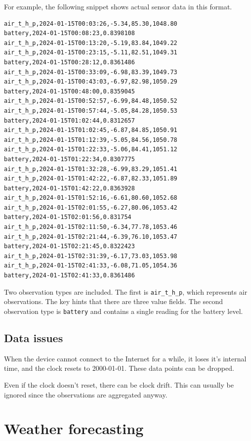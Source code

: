 \documentclass[
]{book}
\begin{document}
For example, the following snippet shows actual sensor data in this format.

\begin{verbatim}
air_t_h_p,2024-01-15T00:03:26,-5.34,85.30,1048.80
battery,2024-01-15T00:08:23,0.8398108
air_t_h_p,2024-01-15T00:13:20,-5.19,83.84,1049.22
air_t_h_p,2024-01-15T00:23:15,-5.11,82.51,1049.31
battery,2024-01-15T00:28:12,0.8361486
air_t_h_p,2024-01-15T00:33:09,-6.98,83.39,1049.73
air_t_h_p,2024-01-15T00:43:03,-6.97,82.98,1050.29
battery,2024-01-15T00:48:00,0.8359045
air_t_h_p,2024-01-15T00:52:57,-6.99,84.48,1050.52
air_t_h_p,2024-01-15T00:57:44,-5.05,84.28,1050.53
battery,2024-01-15T01:02:44,0.8312657
air_t_h_p,2024-01-15T01:02:45,-6.87,84.85,1050.91
air_t_h_p,2024-01-15T01:12:39,-5.05,84.56,1050.78
air_t_h_p,2024-01-15T01:22:33,-5.06,84.41,1051.12
battery,2024-01-15T01:22:34,0.8307775
air_t_h_p,2024-01-15T01:32:28,-6.99,83.29,1051.41
air_t_h_p,2024-01-15T01:42:22,-6.87,82.33,1051.89
battery,2024-01-15T01:42:22,0.8363928
air_t_h_p,2024-01-15T01:52:16,-6.61,80.60,1052.68
air_t_h_p,2024-01-15T02:01:55,-6.27,80.06,1053.42
battery,2024-01-15T02:01:56,0.831754
air_t_h_p,2024-01-15T02:11:50,-6.34,77.78,1053.46
air_t_h_p,2024-01-15T02:21:44,-6.39,76.10,1053.47
battery,2024-01-15T02:21:45,0.8322423
air_t_h_p,2024-01-15T02:31:39,-6.17,73.03,1053.98
air_t_h_p,2024-01-15T02:41:33,-6.08,71.05,1054.36
battery,2024-01-15T02:41:33,0.8361486
\end{verbatim}

Two observation types are included. The first is \texttt{air\_t\_h\_p},
which represents air observations.
The key hints that there are three value fields.
The second observation type is \texttt{battery} and contains a single reading
for the battery level.

\hypertarget{data-issues}{%
\subsection{Data issues}\label{data-issues}}

When the device cannot connect to the Internet for a while, it loses it's
internal time, and the clock resets to 2000-01-01.
These data points can be dropped.

Even if the clock doesn't reset, there can be clock drift.
This can usually be ignored since the observations are aggregated anyway.

\hypertarget{weather-forecasting}{%
\section{Weather forecasting}\label{weather-forecasting}}
\end{document}
